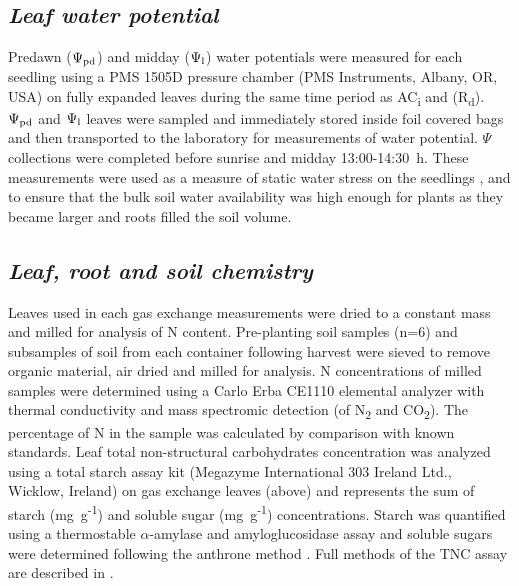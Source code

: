 \documentclass[a4paper]{article}\usepackage[]{graphicx}\usepackage[]{color}
\begin{document}
\subsection*{\textit{Leaf water potential}}
Predawn ($\Psi\textsubscript{pd}$) and midday ($\Psi\textsubscript{l}$) water potentials were measured for each seedling using a PMS 1505D pressure chamber (PMS Instruments, Albany, OR, USA) on fully expanded leaves during the same time period as AC\textsubscript{i} and (R\textsubscript{d}). $\Psi\textsubscript{pd}$ and $\Psi\textsubscript{l}$ leaves were sampled and immediately stored inside foil covered bags and then transported to the laboratory for measurements of water potential. $\Psi$ collections were completed before sunrise and midday 13:00-14:30~h. These measurements were used as a measure of static water stress on the seedlings \citep{sellin1999does}, and to ensure that the bulk soil water availability was high enough for plants as they became larger and roots filled the soil volume. 

\subsection*{\textit{Leaf, root and soil chemistry}}
Leaves used in each gas exchange measurements were dried to a constant mass and milled for analysis of N content. Pre-planting soil samples (n=6) and subsamples of soil from each container following harvest were sieved to remove organic material, air dried and milled for analysis. N concentrations of milled samples were determined using a Carlo Erba CE1110 elemental analyzer with thermal conductivity and mass spectromic detection (of N\textsubscript{2} and CO\textsubscript{2}).  The percentage of N in the sample was calculated by comparison with known standards. Leaf total non-structural carbohydrates concentration was analyzed using a total starch assay kit (Megazyme International 303 Ireland Ltd., Wicklow, Ireland) on gas exchange leaves (above) and represents the sum of starch (mg~g\textsuperscript{-1}) and soluble sugar (mg~g\textsuperscript{-1}) concentrations. Starch was quantified using a thermostable $\alpha$-amylase and amyloglucosidase assay \citep{MCCLEARY} and soluble sugars were determined following the anthrone method \citep{ebell1969variation}. Full methods of the TNC assay are described in \citep{mitchell2013drought}.
\end{document}
